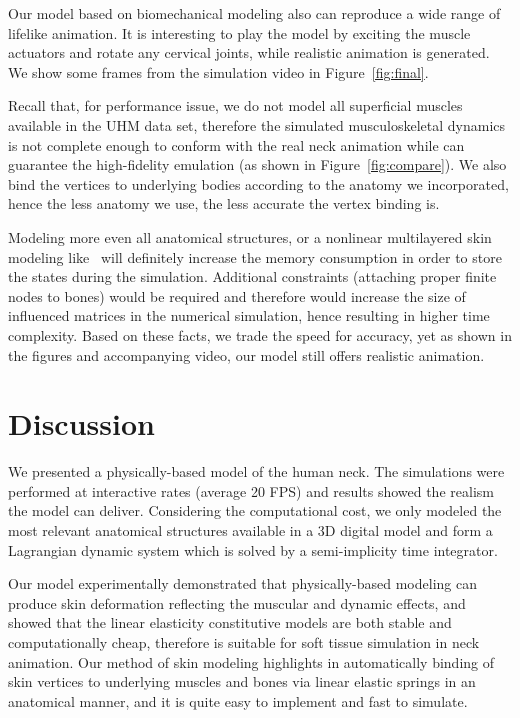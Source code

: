 Our model based on biomechanical modeling also can reproduce a wide range of lifelike animation. It is interesting to play the model by exciting the muscle actuators and rotate any cervical joints, while realistic animation is generated. We show some frames from the simulation video in Figure~\ref{fig:final}.

Recall that, for performance issue, we do not model all superficial muscles available in the UHM data set, therefore the simulated musculoskeletal dynamics is not complete enough to conform with the real neck animation while can guarantee the high-fidelity emulation (as shown in Figure~\ref{fig:compare}). We also bind the vertices to underlying bodies according to the anatomy we incorporated, hence the less anatomy we use, the less accurate the vertex binding is.

Modeling more even all anatomical structures, or a nonlinear multilayered skin modeling like~\cite{Zhang:2004:NPM,Fratarcangeli:2005:physically} will definitely increase the memory consumption in order to store the states during the simulation. Additional constraints (attaching proper finite nodes to bones) would be required and therefore would increase the size of influenced matrices in the numerical simulation, hence resulting in higher time complexity. Based on these facts, we trade the speed for accuracy, yet as shown in the figures and accompanying video, our model still offers realistic animation.

\section{Discussion}
\label{sec:dis}
We presented a physically-based model of the human neck. The simulations were performed at interactive rates (average 20 FPS) and results showed the realism the model can deliver. Considering the computational cost, we only modeled the most relevant anatomical structures available in a 3D digital model and form a Lagrangian dynamic system which is solved by a semi-implicity time integrator.

Our model experimentally demonstrated that physically-based modeling can produce skin deformation reflecting the muscular and dynamic effects, and showed that the linear elasticity constitutive models are both stable and computationally cheap, therefore is suitable for soft tissue simulation in neck animation. Our method of skin modeling highlights in automatically binding of skin vertices to underlying
muscles and bones via linear elastic springs in an anatomical manner, and it is quite easy to implement and fast to simulate.

